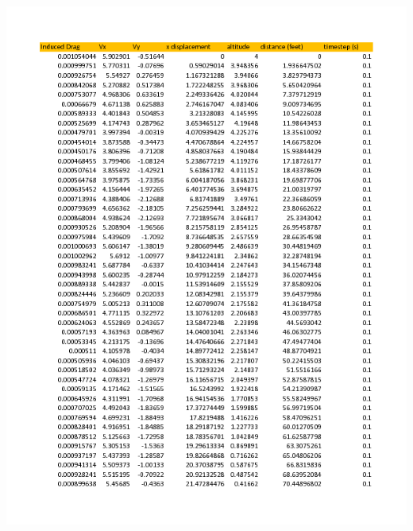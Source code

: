 \documentclass{article}
\begin{document}
\begin{minipage}{0.5\linewidth}
	\includegraphics[width = \textwidth]{glider_trajectory-5.png}
\end{minipage}
\end{document}
